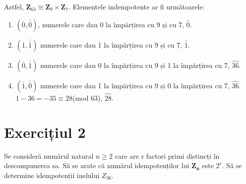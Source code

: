 \documentclass{article}
\begin{document}
\newline
Astfel, $\mathbf{Z}_{63} \cong \mathbf{Z}_{9} \times \mathbf{Z}_{7}$. Elementele indempotente ar fi următoarele: 
\begin{enumerate}
    \item $(\overline{0}, \overline{\overline{0}})$, numerele care dau 0 la împărțirea cu 9  și cu 7, $\widehat{0}$.
    \item $(\overline{1}, \overline{\overline{1}})$ numerele care dau 1 la împărțirea cu 9  și cu 7, $\widehat{1}$.
    \item $(\overline{0}, \overline{\overline{1}})$ numerele care dau 0 la împărțirea cu 9  și 1 la împărțirea cu 7, $\widehat{36}$.
    \item $(\overline{1}, \overline{\overline{0}})$ numerele care dau 1 la împărțirea cu 9  și 0 la împărțirea cu 7, $\widehat{36}$. $1 - 36 = -35 \equiv 28$(mod 63), $\widehat{28}$.
\end {enumerate}


\section{Exercițiul 2}
Se consideră numărul natural $n \geq 2$ care are r factori primi distincți în descompunerea sa. Să se arate că numărul idempotenților lui $\mathbf{Z_n}$ este $2^r$. Să se determine idempotenții inelului $Z_{36}$.
\end{document}
